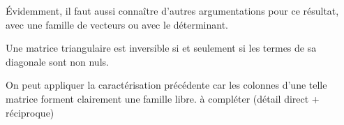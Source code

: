 \begin{rem}
  \'Evidemment, il faut aussi connaître d'autres argumentations pour ce résultat, avec une famille de vecteurs ou avec le déterminant.
\end{rem}
\begin{prop}
Une matrice triangulaire est inversible si et seulement si les termes de sa diagonale sont non nuls. 
\end{prop}
\begin{demo}
 On peut appliquer la caractérisation précédente car les colonnes d'une telle matrice forment clairement une famille libre. à compléter (détail direct + réciproque)
\end{demo}



